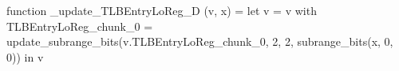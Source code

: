 function _update_TLBEntryLoReg_D (v, x) = let v = { v with TLBEntryLoReg_chunk_0 = update_subrange_bits(v.TLBEntryLoReg_chunk_0, 2, 2, subrange_bits(x, 0, 0)) } in
  v
